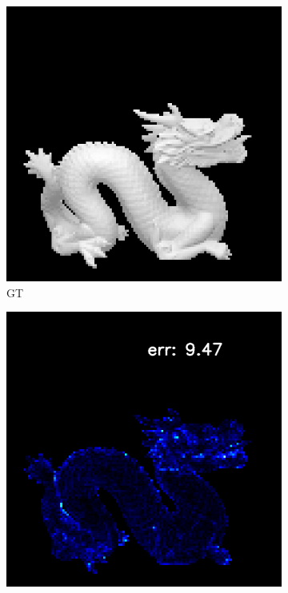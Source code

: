 \begin{figure}[H]
	\begin{subfigure}[b]{0.24\linewidth}
		\includegraphics[width=\linewidth]{./Figures/gcnn_synthetic/fancy_eval_7_img.png}
		\caption{GT}
	\end{subfigure}
	\begin{subfigure}[b]{0.24\linewidth}
		\includegraphics[width=\linewidth]{./Figures/gcnn_synthetic/fancy_eval_7_error_GCNN-GCNN.png}

\end{subfigure}
\end{figure}

